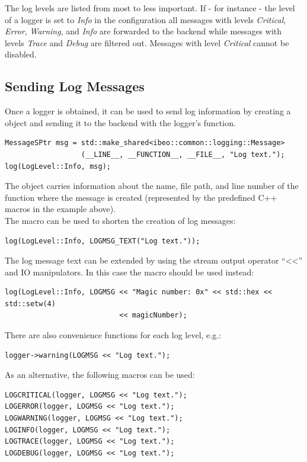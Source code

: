 The log levels are listed from most to less important. If - for instance - the level of a logger is set to \textit{Info} in the configuration all messages with levels \textit{Critical}, \textit{Error}, \textit{Warning}, and \textit{Info} are forwarded to the backend while messages with levels \textit{Trace} and \textit{Debug} are filtered out. Messages with level \textit{Critical} cannot be disabled.

\subsection{Sending Log Messages} \label{sec:sendinglogmessages}
Once a logger is obtained, it can be used to send log information by creating a  object and sending it to the backend with the logger's  function.
\begin{lstlisting}[numbers=none]
MessageSPtr msg = std::make_shared<ibeo::common::logging::Message>
                  (__LINE__, __FUNCTION__, __FILE__, "Log text.");
log(LogLevel::Info, msg);
\end{lstlisting}

The  object carries information about the name, file path, and line number of the function where the message is created (represented by the predefined C++ macros in the example above).\\
The  macro can be used to shorten the creation of log messages:
\begin{lstlisting}[numbers=none]
log(LogLevel::Info, LOGMSG_TEXT("Log text."));
\end{lstlisting}

The log message text can be extended by using the stream output operator “<<” and IO manipulators. In this case the  macro should be used instead:
\begin{lstlisting}[numbers=none]
log(LogLevel::Info, LOGMSG << "Magic number: 0x" << std::hex << std::setw(4)
                           << magicNumber);
\end{lstlisting}

There are also convenience functions for each log level, e.g.:
\begin{lstlisting}[numbers=none]
logger->warning(LOGMSG << "Log text.");
\end{lstlisting}

As an alternative, the following macros can be used:
\begin{lstlisting}[numbers=none]
LOGCRITICAL(logger, LOGMSG << "Log text.");
LOGERROR(logger, LOGMSG << "Log text.");
LOGWARNING(logger, LOGMSG << "Log text.");
LOGINFO(logger, LOGMSG << "Log text.");
LOGTRACE(logger, LOGMSG << "Log text.");
LOGDEBUG(logger, LOGMSG << "Log text.");
\end{lstlisting}


